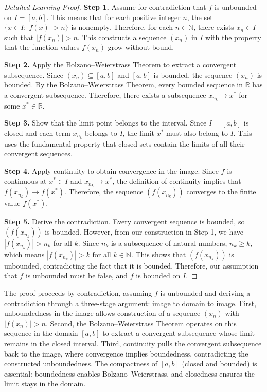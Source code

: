 \begin{proof}[Detailed Learning Proof]
\LRAProofBodyStart

\textbf{Step 1.} Assume for contradiction that $f$ is unbounded on $I = [a,b]$. This means that for each positive integer $n$, the set $\{x \in I : |f(x)| > n\}$ is nonempty. Therefore, for each $n \in \mathbb{N}$, there exists $x_n \in I$ such that $|f(x_n)| > n$. This constructs a sequence $(x_n)$ in $I$ with the property that the function values $f(x_n)$ grow without bound.

\textbf{Step 2.} Apply the Bolzano--Weierstrass Theorem to extract a convergent subsequence. Since $(x_n) \subseteq [a,b]$ and $[a,b]$ is bounded, the sequence $(x_n)$ is bounded. By the Bolzano--Weierstrass Theorem, every bounded sequence in $\mathbb{R}$ has a convergent subsequence. Therefore, there exists a subsequence $x_{n_k} \to x^*$ for some $x^* \in \mathbb{R}$.

\textbf{Step 3.} Show that the limit point belongs to the interval. Since $I = [a,b]$ is closed and each term $x_{n_k}$ belongs to $I$, the limit $x^*$ must also belong to $I$. This uses the fundamental property that closed sets contain the limits of all their convergent sequences.

\textbf{Step 4.} Apply continuity to obtain convergence in the image. Since $f$ is continuous at $x^* \in I$ and $x_{n_k} \to x^*$, the definition of continuity implies that $f(x_{n_k}) \to f(x^*)$. Therefore, the sequence $(f(x_{n_k}))$ converges to the finite value $f(x^*)$.

\textbf{Step 5.} Derive the contradiction. Every convergent sequence is bounded, so $(f(x_{n_k}))$ is bounded. However, from our construction in Step 1, we have $|f(x_{n_k})| > n_k$ for all $k$. Since $n_k$ is a subsequence of natural numbers, $n_k \geq k$, which means $|f(x_{n_k})| > k$ for all $k \in \mathbb{N}$. This shows that $(f(x_{n_k}))$ is unbounded, contradicting the fact that it is bounded. Therefore, our assumption that $f$ is unbounded must be false, and $f$ is bounded on $I$.
\end{proof}

\begin{remark*}
The proof proceeds by contradiction, assuming $f$ is unbounded and deriving a contradiction through a three-stage argument: image to domain to image. First, unboundedness in the image allows construction of a sequence $(x_n)$ with $|f(x_n)| > n$. Second, the Bolzano--Weierstrass Theorem operates on this sequence in the domain $[a,b]$ to extract a convergent subsequence whose limit remains in the closed interval. Third, continuity pulls the convergent subsequence back to the image, where convergence implies boundedness, contradicting the constructed unboundedness. The compactness of $[a,b]$ (closed and bounded) is essential: boundedness enables Bolzano--Weierstrass, and closedness ensures the limit stays in the domain.
\end{remark*}

